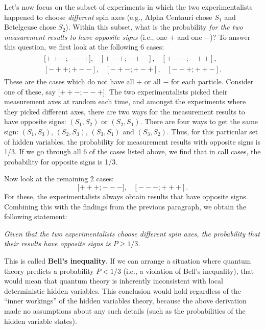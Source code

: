 \documentclass[pra,12pt]{revtex4}
\begin{document}
Let's now focus on the subset of experiments in which the two
experimentalists happened to choose \textit{different} spin axes
(e.g., Alpha Centauri chose $S_1$ and Betelgeuse chose $S_2$).  Within
this subset, what is the probability \textit{for the two measurement
  results to have opposite signs} (i.e., one $+$ and one $-$)?  To
answer this question, we first look at the following 6 cases:
\begin{align*}
  \begin{aligned}{[}{++-};{--+}], \;\;\; [{+-+};{-+-}], \;\;\; [{+--};{-++}],\\ [{-++};{+--}], \;\;\; [{-+-};{+-+}], \;\;\; [{--+};{++-}].\end{aligned}
\end{align*}
These are the cases which do not have all $+$ or all $-$ for each
particle.  Consider one of these, say ${[}{++-};{--+}]$.  The two
experimentalists picked their measurement axes at random each time,
and amongst the experiments where they picked different axes, there
are two ways for the measurement results to have opposite signs:
$(S_1,S_2)$ or $(S_2,S_1)$.  There are four ways to get the same sign:
$(S_1,S_3)$, $(S_2,S_3)$, $(S_3,S_1)$ and $(S_3, S_2)$.  Thus,
for this particular set of hidden variables, the probability for
measurement results with opposite signs is 1/3.  If we go through all
6 of the cases listed above, we find that in call cases, the
probability for opposite signs is 1/3.

Now look at the remaining 2 cases:
\begin{equation*}
  {[}{+++};{---}], \;\;\; [{---};{+++}].
\end{equation*}
For these, the experimentalists always obtain results that have
opposite signs.  Combining this with the findings from the previous
paragraph, we obtain the following statement:

\textit{Given that the two experimentalists choose different spin
  axes, the probability that their results have opposite signs is $P
  \ge 1/3$.}

This is called \textbf{Bell's inequality}.  If we can arrange a
situation where quantum theory predicts a probability $P < 1/3$ (i.e.,
a violation of Bell's inequality), that would mean that quantum theory
is inherently inconsistent with local deterministic hidden variables.
This conclusion would hold regardless of the ``inner workings'' of the
hidden variables theory, because the above derivation made no
assumptions about any such details (such as the probabilities of the
hidden variable states).
\end{document}
